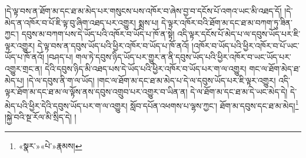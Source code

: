 །དེ་ལྟ་བས་ན་ཐོག་མ་དང་ཐ་མ་མེད་པར་གསུངས་པས་འཁོར་བ་ཞེས་བྱ་བ་དངོས་པོ་འགའ་ཡང་མི་འཐད་དོ། །དེ་མེད་ན་འཁོར་བ་པོ་ཇི་ལྟ་བུ་ཞིག་འཐད་པར་འགྱུར། སྨྲས་པ། དེ་ལྟར་འཁོར་བའི་ཐོག་མ་དང་ཐ་མ་བཀག་ཏུ་ཟིན་ཀྱང་། དབུས་མ་བཀག་པས་དེ་ཡོད་པའི་འཁོར་བ་ཡོད་པ་ཁོ་ན་སྟེ། འདི་ལྟར་དངོས་པོ་མེད་པ་ལ་དབུས་ཡོད་པར་ཇི་ལྟར་འགྱུར། དེ་ལྟ་བས་ན་དབུས་ཡོད་པའི་ཕྱིར་འཁོར་བ་ཡོད་པ་ཁོ་ནའོ། །འཁོར་བ་ཡོད་པའི་ཕྱིར་འཁོར་བ་པོ་ཡང་ཡོད་པ་ཁོ་ནའོ། །བཤད་པ། གལ་ཏེ་དབུས་ཉིད་ཡོད་པར་གྱུར་ན་ནི་དབུས་ཡོད་པའི་ཕྱིར་འཁོར་བ་ཡང་ཡོད་པར་འགྱུར་གྲང་ན། དེའི་དབུས་ཉིད་མི་འཐད་པས་དེ་ཡོད་པའི་ཕྱིར་འཁོར་བ་ཡོད་པར་ག་ལ་འགྱུར། གང་ལ་ཐོག་མེད་ཐ་མེད་པ། །དེ་ལ་དབུས་ནི་ག་ལ་ཡོད། །གང་ལ་ཐོག་མ་དང་ཐ་མ་མེད་པ་དེ་ལ་དབུས་ཡོད་པར་ཇི་ལྟར་འགྱུར། འདི་ལྟར་ཐོག་མ་དང་ཐ་མ་ལ་ལྟོས་ནས་དབུས་འགྲུབ་པར་འགྱུར་བ་ཡིན་ན། དེ་ལ་ཐོག་མ་དང་ཐ་མ་དེ་ཡང་མེད་དེ། དེ་མེད་པའི་ཕྱིར་དེའི་དབུས་ཡོད་པར་ག་ལ་འགྱུར། སློབ་དཔོན་འཕགས་པ་ལྷས་ཀྱང་། ཐོག་མ་དབུས་དང་ཐ་མ་མེད།\footnote{«སྣར་»«པེ་»རྣམས།} །སྐྱེ་བའི་སྔ་རོལ་མི་སྲིད་དེ། །
